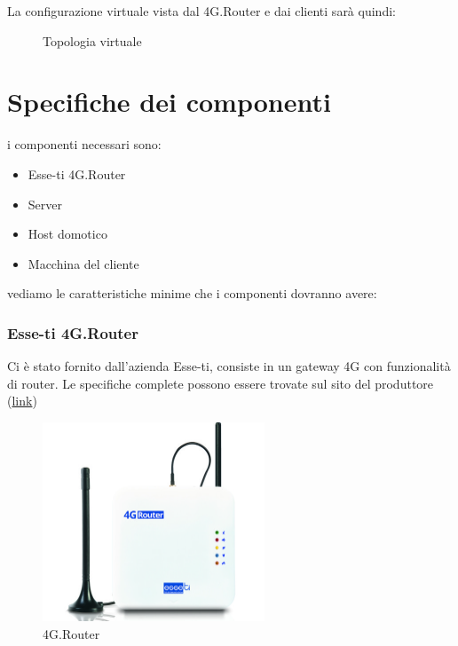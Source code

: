 La configurazione virtuale vista dal 4G.Router e dai clienti sar\`a quindi:

\begin{figure}[ht]
	\centering
	
	\caption{Topologia virtuale}

	\label{fig:schema_architettura_virtuale}

\end{figure}


\section{Specifiche dei componenti}

i componenti necessari sono:

\begin{itemize}
	\item Esse-ti 4G.Router
	\item Server
	\item Host domotico
	\item Macchina del cliente
\end{itemize}

vediamo le caratteristiche minime che i componenti dovranno avere:

\subsubsection{Esse-ti 4G.Router}

Ci \`e stato fornito dall'azienda Esse-ti, consiste in un gateway 4G con funzionalità di router. Le specifiche complete possono essere trovate sul sito del produttore (\href{https://www.esse-ti.it/4g-router}{link})


\begin{figure}[ht]
	\centering
	\includegraphics[width=250px]{immagini/4grouter.jpg}
	\caption{4G.Router}

	\label{fig:esse-ti-router-4g}

\end{figure}


